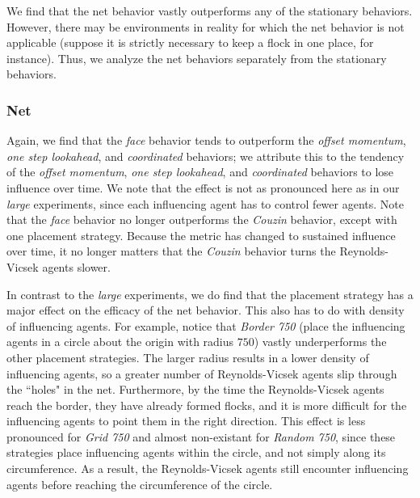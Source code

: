 We find that the net behavior vastly outperforms any of the stationary
behaviors.
However, there may be environments in reality for which the net behavior is not
applicable (suppose it is strictly necessary to keep a flock in one place, for
instance).
Thus, we analyze the net behaviors separately from the stationary behaviors.

\subsubsection{Net}
Again, we find that the \textit{face} behavior tends to outperform the
\textit{offset momentum}, \textit{one step lookahead}, and \textit{coordinated}
behaviors; we attribute this to the tendency of the \textit{offset momentum},
\textit{one step lookahead}, and \textit{coordinated} behaviors to lose
influence over time.
We note that the effect is not as pronounced here as in our \textit{large}
experiments, since each influencing agent has to control fewer agents.
Note that the \textit{face} behavior no longer outperforms the \textit{Couzin}
behavior, except with one placement strategy.
Because the metric has changed to sustained influence over time, it no longer
matters that the \textit{Couzin} behavior turns the Reynolds-Vicsek agents
slower.

In contrast to the \textit{large} experiments, we do find that the placement
strategy has a major effect on the efficacy of the net behavior.
This also has to do with density of influencing agents.
For example, notice that \textit{Border 750} (place the influencing agents in a
circle about the origin with radius $750$) vastly underperforms the other
placement strategies.
The larger radius results in a lower density of influencing agents, so a greater
number of Reynolds-Vicsek agents slip through the ``holes" in the net.
Furthermore, by the time the Reynolds-Vicsek agents reach the border, they have
already formed flocks, and it is more difficult for the influencing agents to
point them in the right direction.
This effect is less pronounced for \textit{Grid 750} and almost non-existant
for \textit{Random 750}, since these strategies place influencing agents within
the circle, and not simply along its circumference.
As a result, the Reynolds-Vicsek agents still encounter influencing agents
before reaching the circumference of the circle.

